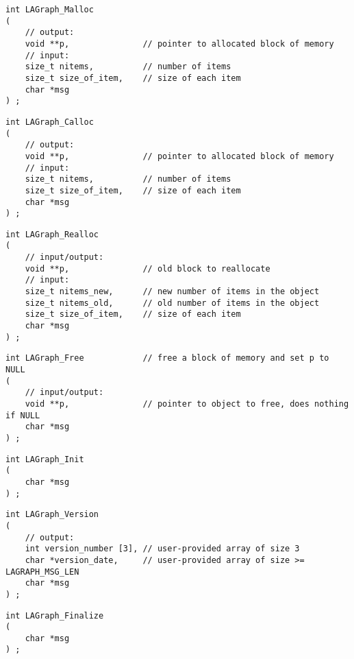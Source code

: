 \begin{verbatim}
int LAGraph_Malloc
(
    // output:
    void **p,               // pointer to allocated block of memory
    // input:
    size_t nitems,          // number of items
    size_t size_of_item,    // size of each item
    char *msg
) ;
\end{verbatim}




\begin{verbatim}
int LAGraph_Calloc
(
    // output:
    void **p,               // pointer to allocated block of memory
    // input:
    size_t nitems,          // number of items
    size_t size_of_item,    // size of each item
    char *msg
) ;
\end{verbatim}




\begin{verbatim}
int LAGraph_Realloc
(
    // input/output:
    void **p,               // old block to reallocate
    // input:
    size_t nitems_new,      // new number of items in the object
    size_t nitems_old,      // old number of items in the object
    size_t size_of_item,    // size of each item
    char *msg
) ;
\end{verbatim}




\begin{verbatim}
int LAGraph_Free            // free a block of memory and set p to NULL
(
    // input/output:
    void **p,               // pointer to object to free, does nothing if NULL
    char *msg
) ;
\end{verbatim}




\begin{verbatim}
int LAGraph_Init
(
    char *msg
) ;
\end{verbatim}




\begin{verbatim}
int LAGraph_Version
(
    // output:
    int version_number [3], // user-provided array of size 3
    char *version_date,     // user-provided array of size >= LAGRAPH_MSG_LEN
    char *msg
) ;
\end{verbatim}




\begin{verbatim}
int LAGraph_Finalize
(
    char *msg
) ;
\end{verbatim}




